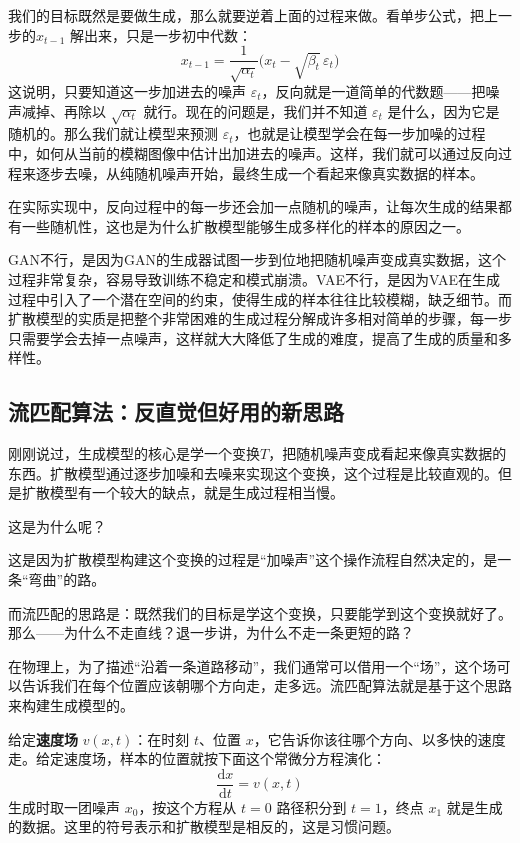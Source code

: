 我们的目标既然是要做生成，那么就要逆着上面的过程来做。看单步公式，把上一步的$x_{t-1}$ 解出来，只是一步初中代数：
\begin{equation}
x_{t-1} = \frac{1}{\sqrt{\alpha_t}}\big(x_t - \sqrt{\beta_t}\,\varepsilon_t\big)
\end{equation}
这说明，只要知道这一步加进去的噪声 $\varepsilon_t$，反向就是一道简单的代数题——把噪声减掉、再除以 $\sqrt{\alpha_t}$ 就行。现在的问题是，我们并不知道 $\varepsilon_t$ 是什么，因为它是随机的。那么我们就让模型来预测 $\varepsilon_t$，也就是让模型学会在每一步加噪的过程中，如何从当前的模糊图像中估计出加进去的噪声。这样，我们就可以通过反向过程来逐步去噪，从纯随机噪声开始，最终生成一个看起来像真实数据的样本。

在实际实现中，反向过程中的每一步还会加一点随机的噪声，让每次生成的结果都有一些随机性，这也是为什么扩散模型能够生成多样化的样本的原因之一。

GAN不行，是因为GAN的生成器试图一步到位地把随机噪声变成真实数据，这个过程非常复杂，容易导致训练不稳定和模式崩溃。VAE不行，是因为VAE在生成过程中引入了一个潜在空间的约束，使得生成的样本往往比较模糊，缺乏细节。而扩散模型的实质是把整个非常困难的生成过程分解成许多相对简单的步骤，每一步只需要学会去掉一点噪声，这样就大大降低了生成的难度，提高了生成的质量和多样性。

\subsection{流匹配算法：反直觉但好用的新思路}

刚刚说过，生成模型的核心是学一个变换$T$，把随机噪声变成看起来像真实数据的东西。扩散模型通过逐步加噪和去噪来实现这个变换，这个过程是比较直观的。但是扩散模型有一个较大的缺点，就是生成过程相当慢。

这是为什么呢？

这是因为扩散模型构建这个变换的过程是“加噪声”这个操作流程自然决定的，是一条“弯曲”的路。

而流匹配的思路是：既然我们的目标是学这个变换，只要能学到这个变换就好了。那么——为什么不走直线？退一步讲，为什么不走一条更短的路？

在物理上，为了描述“沿着一条道路移动”，我们通常可以借用一个“场”，这个场可以告诉我们在每个位置应该朝哪个方向走，走多远。流匹配算法就是基于这个思路来构建生成模型的。

给定\textbf{速度场} $v(x, t)$：在时刻 $t$、位置 $x$，它告诉你该往哪个方向、以多快的速度走。给定速度场，样本的位置就按下面这个常微分方程演化：
\begin{equation}
\frac{\mathrm{d}x}{\mathrm{d}t} = v(x, t)
\end{equation}
生成时取一团噪声 $x_0$，按这个方程从 $t=0$ 路径积分到 $t=1$，终点 $x_1$ 就是生成的数据。这里的符号表示和扩散模型是相反的，这是习惯问题。


